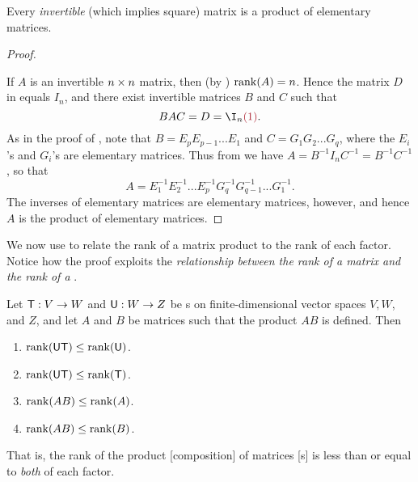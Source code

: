 \begin{corollary} \label{corollary 3.6.3}
Every \emph{invertible} (which implies square) matrix is a product of elementary matrices.
\end{corollary}

\begin{proof} \ 

If \(A\) is an invertible \(n \times n\) matrix, then (by ) \(\mathrm{rank}(A) = n\).
Hence the matrix \(D\) in  equals \(I_n\), and there exist invertible matrices \(B\) and
\(C\) such that
\[
    BAC = D = \I_n \MAROON{(1)}.
\]
As in the proof of , note that \(B = E_p E_{p - 1} ... E_1\) and \(C = G_1 G_2 ... G_q\), where the \(E_i\)'s and \(G_i\)'s are elementary matrices.
Thus from  we have \(A = B^{-1} I_n C^{-1} = B^{-1} C^{-1}\),
so that
\[
    A = E_1^{-1} E_2^{-1} ... E_p^{-1} G_q^{-1} G_{q - 1}^{-1} ... G_1^{-1}.
\]
The inverses of elementary matrices are elementary matrices, however, and hence \(A\) is the product of elementary matrices.
\end{proof}

We now use  to relate the rank of a matrix product to the rank of each factor.
Notice how the proof exploits the \emph{relationship between the rank of a matrix and the rank of a \LTRAN{}}.

\begin{theorem} \label{thm 3.7}
Let \(\textsf{T} : V \to W\) and \(\textsf{U} : W \to Z\) be \LTRAN{}s on finite-dimensional vector spaces \(V, W\), and \(Z\), and let \(A\) and \(B\) be matrices such that the product \(AB\) is defined.
Then
\begin{enumerate}
\item \(\mathrm{rank}(\textsf{U}\textsf{T}) \le \mathrm{rank}(\textsf{U})\).
\item \(\mathrm{rank}(\textsf{U}\textsf{T}) \le \mathrm{rank}(\textsf{T})\).
\item \(\mathrm{rank}(AB) \le \mathrm{rank}(A)\).
\item \(\mathrm{rank}(AB) \le \mathrm{rank}(B)\).
\end{enumerate}
That is, the rank of the product [composition] of matrices [\LTRAN{}s] is less than or equal to \emph{both} of each factor.
\end{theorem}

